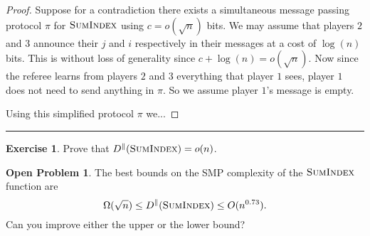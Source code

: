 \documentclass[11pt]{amsart}
\theoremstyle{plain}
\theoremstyle{definition}
\newtheorem{exercise}{Exercise}
\newtheorem{open}{Open Problem}
\theoremstyle{plain}
\newcommand{\SumIndex}{\textsc{SumIndex}}
\newcommand{\exercises}{\bigskip \noindent\rule{8cm}{0.4pt} \medskip}
\begin{document}
\begin{proof}
Suppose for a contradiction there exists a simultaneous message passing protocol $\pi$ for $\SumIndex$ using $c = o(\sqrt{n})$ bits. We may assume that players $2$ and $3$ announce their $j$ and $i$ respectively in their messages at a cost of $\log(n)$ bits. This is without loss of generality since $c + \log(n) = o(\sqrt{n})$. Now since the referee learns from players $2$ and $3$ everything that player $1$ sees, player $1$ does not need to send anything in $\pi$. So we assume player $1$'s message is empty.

Using this simplified protocol $\pi$ we...
\end{proof}

\exercises

\begin{exercise}
Prove that $D^\parallel(\SumIndex) = o(n)$.
\end{exercise}

\begin{open}
The best bounds on the SMP complexity of the $\SumIndex$ function are
\[
\Omega(\sqrt{n}) \le D^\parallel(\SumIndex) \le O(n^{0.73}).
\]
Can you improve either the upper or the lower bound?
\end{open}
\end{document}

